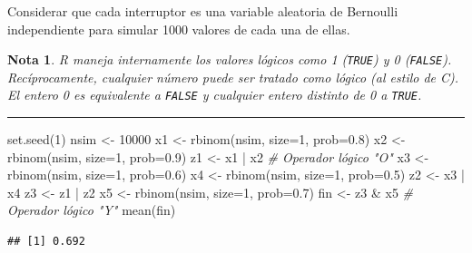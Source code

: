 \documentclass[
]{book}
\newenvironment{Shaded}{\begin{snugshade}}{\end{snugshade}}
\newcommand{\AttributeTok}[1]{\textcolor[rgb]{0.77,0.63,0.00}{#1}}
\newcommand{\CommentTok}[1]{\textcolor[rgb]{0.56,0.35,0.01}{\textit{#1}}}
\newcommand{\DecValTok}[1]{\textcolor[rgb]{0.00,0.00,0.81}{#1}}
\newcommand{\FloatTok}[1]{\textcolor[rgb]{0.00,0.00,0.81}{#1}}
\newcommand{\FunctionTok}[1]{\textcolor[rgb]{0.00,0.00,0.00}{#1}}
\newcommand{\NormalTok}[1]{#1}
\newcommand{\OtherTok}[1]{\textcolor[rgb]{0.56,0.35,0.01}{#1}}
\newcommand{\SpecialCharTok}[1]{\textcolor[rgb]{0.00,0.00,0.00}{#1}}
\theoremstyle{break}
\theoremstyle{nonumberplain}
\newtheorem{remark}{Nota}
\begin{document}
Considerar que cada interruptor es una variable aleatoria de Bernoulli independiente
para simular 1000 valores de cada una de ellas.

\begin{remark}
R maneja internamente los valores lógicos como 1 (\texttt{TRUE}) y 0 (\texttt{FALSE}).
Recíprocamente, cualquier número puede ser tratado como lógico (al estilo de C).
El entero 0 es equivalente a \texttt{FALSE} y cualquier entero distinto de 0 a \texttt{TRUE}.
\end{remark}

\begin{center}\rule{0.5\linewidth}{0.5pt}\end{center}

\begin{Shaded}
\begin{Highlighting}[]
\FunctionTok{set.seed}\NormalTok{(}\DecValTok{1}\NormalTok{)}
\NormalTok{nsim }\OtherTok{\textless{}{-}} \DecValTok{10000}
\NormalTok{x1 }\OtherTok{\textless{}{-}} \FunctionTok{rbinom}\NormalTok{(nsim, }\AttributeTok{size=}\DecValTok{1}\NormalTok{, }\AttributeTok{prob=}\FloatTok{0.8}\NormalTok{)}
\NormalTok{x2 }\OtherTok{\textless{}{-}} \FunctionTok{rbinom}\NormalTok{(nsim, }\AttributeTok{size=}\DecValTok{1}\NormalTok{, }\AttributeTok{prob=}\FloatTok{0.9}\NormalTok{)}
\NormalTok{z1 }\OtherTok{\textless{}{-}}\NormalTok{ x1 }\SpecialCharTok{|}\NormalTok{ x2   }\CommentTok{\# Operador lógico "O"}
\NormalTok{x3 }\OtherTok{\textless{}{-}} \FunctionTok{rbinom}\NormalTok{(nsim, }\AttributeTok{size=}\DecValTok{1}\NormalTok{, }\AttributeTok{prob=}\FloatTok{0.6}\NormalTok{)}
\NormalTok{x4 }\OtherTok{\textless{}{-}} \FunctionTok{rbinom}\NormalTok{(nsim, }\AttributeTok{size=}\DecValTok{1}\NormalTok{, }\AttributeTok{prob=}\FloatTok{0.5}\NormalTok{)}
\NormalTok{z2 }\OtherTok{\textless{}{-}}\NormalTok{ x3 }\SpecialCharTok{|}\NormalTok{ x4}
\NormalTok{z3 }\OtherTok{\textless{}{-}}\NormalTok{ z1 }\SpecialCharTok{|}\NormalTok{ z2}
\NormalTok{x5 }\OtherTok{\textless{}{-}} \FunctionTok{rbinom}\NormalTok{(nsim, }\AttributeTok{size=}\DecValTok{1}\NormalTok{, }\AttributeTok{prob=}\FloatTok{0.7}\NormalTok{)}
\NormalTok{fin }\OtherTok{\textless{}{-}}\NormalTok{ z3 }\SpecialCharTok{\&}\NormalTok{ x5  }\CommentTok{\# Operador lógico "Y"}
\FunctionTok{mean}\NormalTok{(fin)}
\end{Highlighting}
\end{Shaded}

\begin{verbatim}
## [1] 0.692
\end{verbatim}
\end{document}
